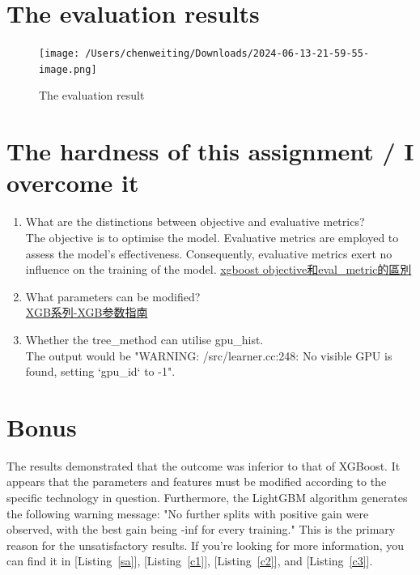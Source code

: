 \documentclass{article}
\begin{document}
\section{ The evaluation results}

\begin{figure}[H]
    \centering
    \texttt{[image: /Users/chenweiting/Downloads/2024-06-13-21-59-55-image.png]}
    \caption{The evaluation result}
    \label{ans}
  \end{figure}


\section{The hardness of this assignment / I overcome it}

\begin{enumerate}

\item What are the distinctions between objective and evaluative metrics?\\ 
The objective is to optimise the model. Evaluative metrics are employed to assess the model's effectiveness. Consequently, evaluative metrics exert no influence on the training of the model.
\href{https://reurl.cc/nNR4Ge}{xgboost objective和eval\_metric的區別}


\item What parameters can be modified? \\
\href{https://blog.csdn.net/wwlsm_zql/article/details/126192959}{XGB系列-XGB参数指南}

\item Whether the tree\_method can utilise gpu\_hist.\\
The output would be "WARNING: /src/learner.cc:248: No visible GPU is found, setting `gpu\_id` to -1".

\end{enumerate}


\section{Bonus}


The results demonstrated that the outcome was inferior to that of XGBoost. It appears that the parameters and features must be modified according to the specific technology in question. Furthermore, the LightGBM algorithm generates the following warning message: "No further splits with positive gain were observed, with the best gain being -inf for every training." This is the primary reason for the unsatisfactory results. If you're looking for more information, you can find it in [Listing~\ref{sa}], [Listing~\ref{c1}], [Listing~\ref{c2}], and [Listing~\ref{c3}].
\end{document}
